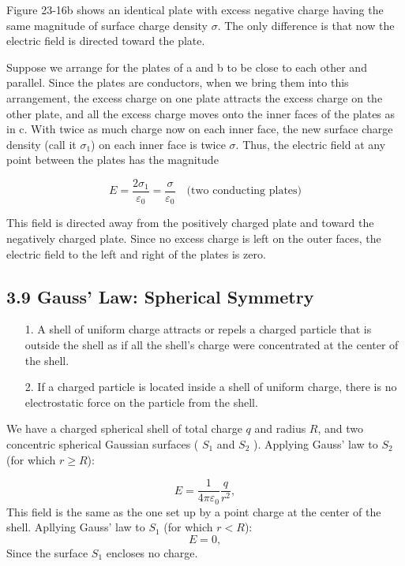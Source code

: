 \documentclass[12pt, a4paper]{article}
\begin{document}
		Figure 23-16b shows an identical plate with excess negative charge having the same magnitude of surface charge density $\sigma$. The only difference is that now the electric field is directed toward the plate.
		
		Suppose we arrange for the plates of a and b to be close to each other and parallel. Since the plates are conductors, when we bring them into this arrangement, the excess charge on one plate attracts the excess charge on the other plate, and all the excess charge moves onto the inner faces of the plates as in c. With twice as much charge now on each inner face, the new surface charge density (call it $\sigma_1$) on each inner face is twice $\sigma$. Thus, the electric field at any point between the plates has the magnitude
		
		\begin{equation}
			E = \frac{2\sigma_1}{\varepsilon_0} = \frac{\sigma}{\varepsilon_0}
			\quad \text{(two conducting plates)} \tag{3-13}
		\end{equation}
		
		This field is directed away from the positively charged plate and toward the negatively charged plate. Since no excess charge is left on the outer faces, the electric field to the left and right of the plates is zero.
		


		\subsection*{3.9 Gauss' Law: Spherical Symmetry}
		
		\begin{itemize}
			\item[1.] A shell of uniform charge attracts or repels a charged particle that is outside the shell
			as if all the shell’s charge were concentrated at the center of the shell.  
			\item[2.] If a charged particle is located inside a shell of uniform charge, there is no electrostatic
			force on the particle from the shell.
		\end{itemize}

		We have a charged spherical shell of total charge $q$ and radius $R$, and two concentric spherical Gaussian surfaces ( $S_1$ and $S_2$ ). Applying Gauss’ law to $S_2$ (for which $r \geq R$):
		
		\begin{equation}
			E = \frac{1}{4\pi\varepsilon_0} \frac{q}{r^2}, 
			\tag{(spherical shell, field at $r \geq R$), 3-14}
		\end{equation}
		This field is the same as the one set up by a point charge at the center of the shell. Apllying Gauss' law to $S_1$ (for which $r < R$):
		\begin{equation}
			E = 0,
			\tag{spherical shell, field at $r < R$, 3-15}
		\end{equation}
		Since the surface $S_1$ encloses no charge.
		
\end{document}
